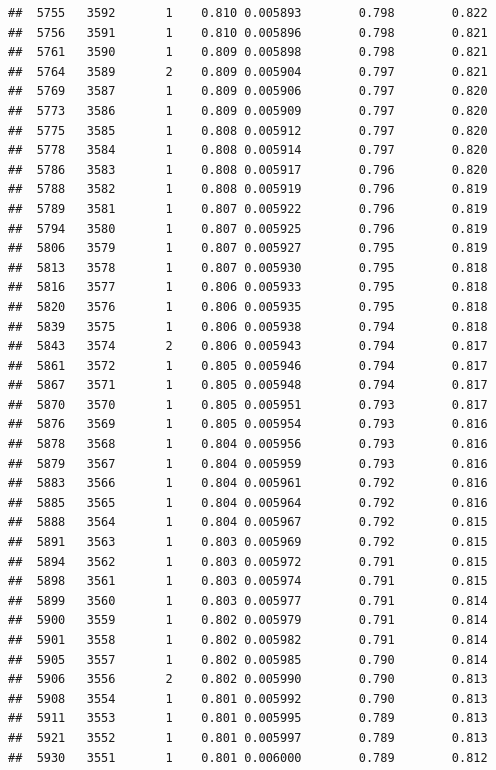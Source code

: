 \documentclass[
]{book}
\begin{document}
\begin{verbatim}
##  5755   3592       1    0.810 0.005893        0.798        0.822
##  5756   3591       1    0.810 0.005896        0.798        0.821
##  5761   3590       1    0.809 0.005898        0.798        0.821
##  5764   3589       2    0.809 0.005904        0.797        0.821
##  5769   3587       1    0.809 0.005906        0.797        0.820
##  5773   3586       1    0.809 0.005909        0.797        0.820
##  5775   3585       1    0.808 0.005912        0.797        0.820
##  5778   3584       1    0.808 0.005914        0.797        0.820
##  5786   3583       1    0.808 0.005917        0.796        0.820
##  5788   3582       1    0.808 0.005919        0.796        0.819
##  5789   3581       1    0.807 0.005922        0.796        0.819
##  5794   3580       1    0.807 0.005925        0.796        0.819
##  5806   3579       1    0.807 0.005927        0.795        0.819
##  5813   3578       1    0.807 0.005930        0.795        0.818
##  5816   3577       1    0.806 0.005933        0.795        0.818
##  5820   3576       1    0.806 0.005935        0.795        0.818
##  5839   3575       1    0.806 0.005938        0.794        0.818
##  5843   3574       2    0.806 0.005943        0.794        0.817
##  5861   3572       1    0.805 0.005946        0.794        0.817
##  5867   3571       1    0.805 0.005948        0.794        0.817
##  5870   3570       1    0.805 0.005951        0.793        0.817
##  5876   3569       1    0.805 0.005954        0.793        0.816
##  5878   3568       1    0.804 0.005956        0.793        0.816
##  5879   3567       1    0.804 0.005959        0.793        0.816
##  5883   3566       1    0.804 0.005961        0.792        0.816
##  5885   3565       1    0.804 0.005964        0.792        0.816
##  5888   3564       1    0.804 0.005967        0.792        0.815
##  5891   3563       1    0.803 0.005969        0.792        0.815
##  5894   3562       1    0.803 0.005972        0.791        0.815
##  5898   3561       1    0.803 0.005974        0.791        0.815
##  5899   3560       1    0.803 0.005977        0.791        0.814
##  5900   3559       1    0.802 0.005979        0.791        0.814
##  5901   3558       1    0.802 0.005982        0.791        0.814
##  5905   3557       1    0.802 0.005985        0.790        0.814
##  5906   3556       2    0.802 0.005990        0.790        0.813
##  5908   3554       1    0.801 0.005992        0.790        0.813
##  5911   3553       1    0.801 0.005995        0.789        0.813
##  5921   3552       1    0.801 0.005997        0.789        0.813
##  5930   3551       1    0.801 0.006000        0.789        0.812

\end{verbatim}
\end{document}
